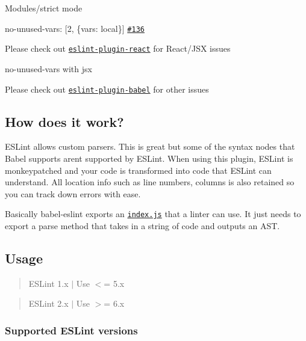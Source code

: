 Modules/strict mode
\begin{DoxyItemize}
\item {\ttfamily no-\/unused-\/vars\+: \mbox{[}2, \{vars\+: local\}\mbox{]}} \href{https://github.com/babel/babel-eslint/issues/136}{\tt \#136}
\end{DoxyItemize}

Please check out \href{https://github.com/yannickcr/eslint-plugin-react}{\tt eslint-\/plugin-\/react} for React/\+J\+SX issues
\begin{DoxyItemize}
\item {\ttfamily no-\/unused-\/vars} with jsx
\end{DoxyItemize}

Please check out \href{https://github.com/babel/eslint-plugin-babel}{\tt eslint-\/plugin-\/babel} for other issues

\subsection*{How does it work?}

E\+S\+Lint allows custom parsers. This is great but some of the syntax nodes that Babel supports aren\textquotesingle{}t supported by E\+S\+Lint. When using this plugin, E\+S\+Lint is monkeypatched and your code is transformed into code that E\+S\+Lint can understand. All location info such as line numbers, columns is also retained so you can track down errors with ease.

Basically {\ttfamily babel-\/eslint} exports an \href{/index.js}{\tt {\ttfamily index.\+js}} that a linter can use. It just needs to export a {\ttfamily parse} method that takes in a string of code and outputs an A\+ST.

\subsection*{Usage}

\begin{quote}
E\+S\+Lint 1.\+x $\vert$ Use $<$= 5.\+x \end{quote}


\begin{quote}
E\+S\+Lint 2.\+x $\vert$ Use $>$= 6.\+x \end{quote}


\subsubsection*{Supported E\+S\+Lint versions}

